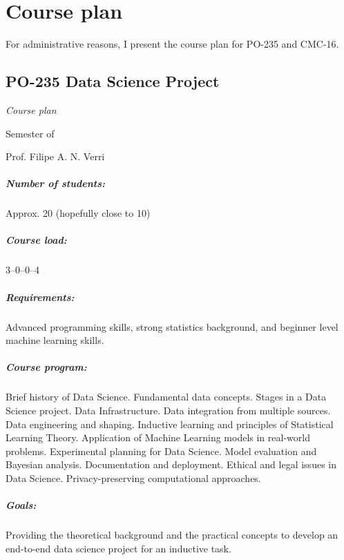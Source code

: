 \chapter*{Course plan}

For administrative reasons, I present the course plan for PO-235 and CMC-16.

\newpage
{}
\thispagestyle{empty}
\section*{PO-235 Data Science Project}

\emph{Course plan}

 Semester of \the\year{}

Prof. Filipe A. N. Verri

\paragraph{Number of students:} Approx. 20 (hopefully close to 10)

\paragraph{Course load:} 3--0--0--4

\paragraph{Requirements:} Advanced programming skills, strong statistics background, and
beginner level machine learning skills.

\paragraph{Course program:}
Brief history of Data Science.  Fundamental data concepts. Stages in a Data Science
project.  Data Infrastructure. Data integration from multiple sources. Data engineering
and shaping.  Inductive learning and principles of Statistical Learning Theory.
Application of Machine Learning models in real-world problems.  Experimental planning for
Data Science. Model evaluation and Bayesian analysis.  Documentation and deployment.
Ethical and legal issues in Data Science.  Privacy-preserving computational approaches.

\paragraph{Goals:}
Providing the theoretical background and the practical concepts to develop an end-to-end
data science project for an inductive task.

